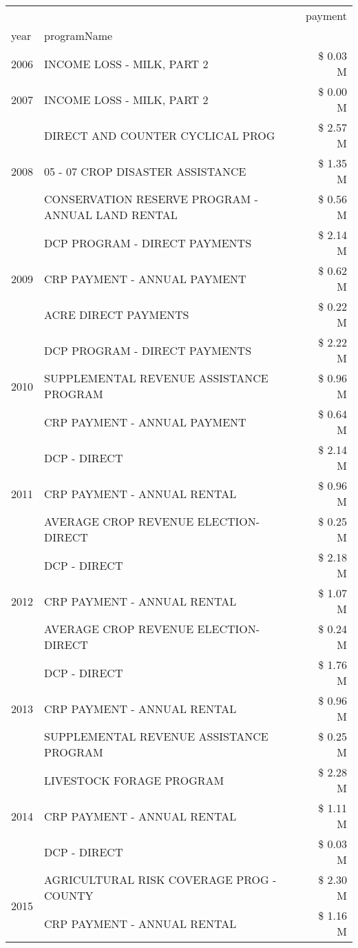 \begin{tabular}{llr}
\toprule
 &  & payment \\
year & programName &  \\
\midrule
2006 & INCOME LOSS - MILK, PART 2 & \$ 0.03 M \\
\cline{1-3}
2007 & INCOME LOSS - MILK, PART 2 & \$ 0.00 M \\
\cline{1-3}
\multirow[t]{3}{*}{2008} & DIRECT AND COUNTER CYCLICAL PROG & \$ 2.57 M \\
 & 05 - 07 CROP DISASTER ASSISTANCE & \$ 1.35 M \\
 & CONSERVATION RESERVE PROGRAM - ANNUAL LAND RENTAL & \$ 0.56 M \\
\cline{1-3}
\multirow[t]{3}{*}{2009} & DCP PROGRAM - DIRECT PAYMENTS & \$ 2.14 M \\
 & CRP PAYMENT - ANNUAL PAYMENT & \$ 0.62 M \\
 & ACRE DIRECT PAYMENTS & \$ 0.22 M \\
\cline{1-3}
\multirow[t]{3}{*}{2010} & DCP PROGRAM - DIRECT PAYMENTS & \$ 2.22 M \\
 & SUPPLEMENTAL REVENUE ASSISTANCE PROGRAM & \$ 0.96 M \\
 & CRP PAYMENT - ANNUAL PAYMENT & \$ 0.64 M \\
\cline{1-3}
\multirow[t]{3}{*}{2011} & DCP - DIRECT & \$ 2.14 M \\
 & CRP PAYMENT - ANNUAL RENTAL & \$ 0.96 M \\
 & AVERAGE CROP REVENUE ELECTION-DIRECT & \$ 0.25 M \\
\cline{1-3}
\multirow[t]{3}{*}{2012} & DCP - DIRECT & \$ 2.18 M \\
 & CRP PAYMENT - ANNUAL RENTAL & \$ 1.07 M \\
 & AVERAGE CROP REVENUE ELECTION-DIRECT & \$ 0.24 M \\
\cline{1-3}
\multirow[t]{3}{*}{2013} & DCP - DIRECT & \$ 1.76 M \\
 & CRP PAYMENT - ANNUAL RENTAL & \$ 0.96 M \\
 & SUPPLEMENTAL REVENUE ASSISTANCE PROGRAM & \$ 0.25 M \\
\cline{1-3}
\multirow[t]{3}{*}{2014} & LIVESTOCK FORAGE PROGRAM & \$ 2.28 M \\
 & CRP PAYMENT - ANNUAL RENTAL & \$ 1.11 M \\
 & DCP - DIRECT & \$ 0.03 M \\
\cline{1-3}
\multirow[t]{3}{*}{2015} & AGRICULTURAL RISK COVERAGE PROG - COUNTY & \$ 2.30 M \\
 & CRP PAYMENT - ANNUAL RENTAL & \$ 1.16 M \\

\end{tabular}
